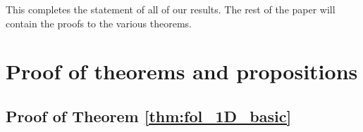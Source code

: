 \documentclass[12pt,oneside]{article}
\begin{document}
This completes the statement of all of our results. The rest of the paper will contain the proofs to the various theorems.


\section{Proof of theorems and propositions} \label{sec:proofs}

\subsection{Proof of Theorem \ref{thm:fol_1D_basic}} \label{sec:proof:fol_1D_basic}
\end{document}
